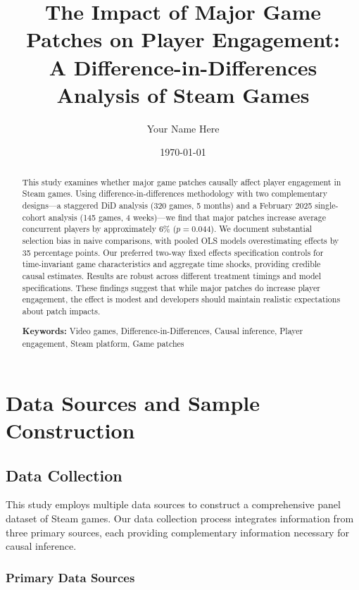 \documentclass[12pt,a4paper]{article}
\title{\textbf{The Impact of Major Game Patches on Player Engagement:} \\ A Difference-in-Differences Analysis of Steam Games}
\author{Your Name Here}
\date{\today}
\begin{document}
\maketitle

\begin{abstract}
This study examines whether major game patches causally affect player engagement in Steam games. Using difference-in-differences methodology with two complementary designs---a staggered DiD analysis (320 games, 5 months) and a February 2025 single-cohort analysis (145 games, 4 weeks)---we find that major patches increase average concurrent players by approximately 6\% ($p=0.044$). We document substantial selection bias in naive comparisons, with pooled OLS models overestimating effects by 35 percentage points. Our preferred two-way fixed effects specification controls for time-invariant game characteristics and aggregate time shocks, providing credible causal estimates. Results are robust across different treatment timings and model specifications. These findings suggest that while major patches do increase player engagement, the effect is modest and developers should maintain realistic expectations about patch impacts.

\noindent \textbf{Keywords:} Video games, Difference-in-Differences, Causal inference, Player engagement, Steam platform, Game patches
\end{abstract}

\newpage
\tableofcontents
\newpage

\section{Data Sources and Sample Construction}

\subsection{Data Collection}

This study employs multiple data sources to construct a comprehensive panel dataset of Steam games. Our data collection process integrates information from three primary sources, each providing complementary information necessary for causal inference.

\subsubsection{Primary Data Sources}
\end{document}
